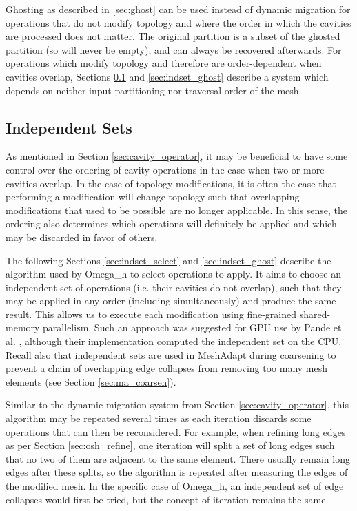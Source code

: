 Ghosting as described in \ref{sec:ghost} can be used instead of dynamic
migration for operations that do not modify topology and
where the order in which the cavities
are processed does not matter.
The original partition is a subset of the ghosted partition
(so will never be empty), and can always be recovered afterwards.
For operations which modify topology and therefore are order-dependent
when cavities overlap,
Sections \ref{sec:indset} and \ref{sec:indset_ghost} describe a system
which depends on neither input partitioning nor traversal order of the mesh.

\subsection{Independent Sets}
\label{sec:indset}

As mentioned in Section \ref{sec:cavity_operator}, it may be beneficial
to have some control over the ordering of cavity operations in the
case when two or more cavities overlap.
In the case of topology modifications, it is often the case that
performing a modification will change topology such that overlapping
modifications that used to be possible are no longer applicable.
In this sense, the ordering also determines which operations will
definitely be applied and which may be discarded in favor of others.

The following Sections \ref{sec:indset_select} and \ref{sec:indset_ghost}
describe the algorithm used by Omega\_h to select operations to apply.
It aims to choose an independent set of operations (i.e. their cavities
do not overlap), such that they may be applied in
any order (including simultaneously) and produce the same result.
This allows us to execute each modification using fine-grained
shared-memory parallelism.
Such an approach was suggested for GPU use by Pande et al. \cite{pandea2015gpu},
although their implementation computed the independent set on the CPU.
Recall also that independent sets are used in MeshAdapt \cite{de1999parallel}
during coarsening to prevent a chain of overlapping edge collapses
from removing too many mesh elements (see Section \ref{sec:ma_coarsen}).

Similar to the dynamic migration system from Section \ref{sec:cavity_operator},
this algorithm may be repeated several times as each iteration
discards some operations that can then be reconsidered.
For example, when refining long edges as per Section \ref{sec:osh_refine},
one iteration will split a set of long edges such that no two of them
are adjacent to the same element.
There usually remain long edges after these splits, so the algorithm
is repeated after measuring the edges of the modified mesh.
In the specific case of Omega\_h, an independent set of edge collapses
would first be tried, but the concept of iteration remains the same.

